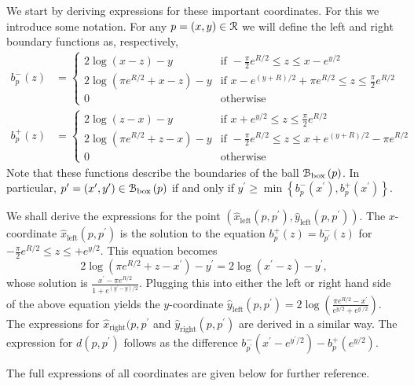 We start by deriving expressions for these important coordinates. For this we introduce some notation. For any $p = (x,y) \in {\mathcal R}$ we will define the left and right boundary functions as, respectively,
\begin{align}
	b_p^-(z) &= \begin{cases}
		2 \log\left(x-z\right) - y &\mbox{if }  -\frac{\pi}{2} e^{R/2} \le z \le x - e^{y/2}  \\
		2\log\left(\pi e^{R/2} + x - z\right) - y 
			&\mbox{if } x - e^{(y + R)/2} + \pi e^{R/2} \le z \le \frac{\pi}{2} e^{R/2}\\
		0 &\mbox{otherwise}
	\end{cases} \label{eq:def_left_boundary_Bp} \\ 
	b_p^+(z) &= \begin{cases}
		2 \log\left(z-x\right) - y &\mbox{if } x + e^{y/2} \le z \le \frac{\pi}{2} e^{R/2} \\
		2\log\left(\pi e^{R/2} + z - x\right) - y 
			&\mbox{if } -\frac{\pi}{2} e^{R/2} \le z \le x + e^{(y + R)/2} - \pi e^{R/2}\\
		0 &\mbox{otherwise}
	\end{cases}
\end{align}
Note that these functions describe the boundaries of the ball ${\mathcal B}_{\text{box}}\left(p\right)$. In particular, $p^\prime = (x^\prime, y^\prime) \in {\mathcal B}_{\text{box}}\left(p\right)$ if and only if $y^\prime \ge \min\left\{b_p^-(x^\prime), b_p^+(x^\prime)\right\}$.

We shall derive the expressions for the point $(\hat{x}_{\text{left}}(p,p^\prime), \hat{y}_{\text{left}}(p,p^\prime))$. The $x$-coordinate $\hat{x}_{\text{left}}(p,p^\prime)$ is the solution to the equation $b_{p}^+(z) = b_{p^\prime}^-(z)$ for $-\frac{\pi}{2} e^{R/2} \le z \le + e^{y/2}$. This equation becomes
\[
	2\log\left(\pi e^{R/2} + z - x^\prime\right) - y^\prime = 2 \log\left(x^\prime-z\right) - y^\prime,
\]
whose solution is $\frac{x^\prime - \pi e^{R/2}}{1 + e^{(y^\prime - y)/2}}$. Plugging this into either the left or right hand side of the above equation yields the $y$-coordinate $\hat{y}_{\text{left}}(p,p^\prime) = 2 \log\left(\frac{\pi e^{R/2} - x^\prime}{e^{y/2} + e^{y^\prime/2}}\right)$. The expressions for $\hat{x}_{\text{right}}(p,p^\prime$ and $\hat{y}_{\text{right}}(p,p^\prime)$ are derived in a similar way. The expression for $d(p,p^\prime)$ follows as the difference $b_{p^\prime}^-(x^\prime - e^{y^\prime/2}) - b_p^+(e^{y/2})$.

The full expressions of all coordinates are given below for further reference.

